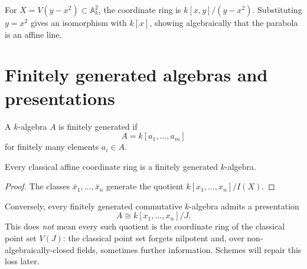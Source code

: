 \begin{center}
\end{center}

\begin{example}\label{ex:vi03-expand-01}
For $X=V(y-x^2)\subset\mathbb A^2_k$, the coordinate ring is $k[x,y]/(y-x^2)$.  Substituting $y=x^2$ gives an isomorphism with $k[x]$, showing algebraically that the parabola is an affine line.
\end{example}
\section{Finitely generated algebras and presentations}
\label{sec:vi03-presentations}

\begin{definition}
A \(k\)-algebra \(A\) is finitely generated if
\[
A=k[a_1,\dots,a_m]
\]
for finitely many elements \(a_i\in A\).
\end{definition}

\begin{proposition}
Every classical affine coordinate ring is a finitely generated \(k\)-algebra.
\end{proposition}

\begin{proof}
The classes \(\bar x_1,\dots,\bar x_n\) generate the quotient
\(k[x_1,\dots,x_n]/I(X)\).
\end{proof}

Conversely, every finitely generated commutative \(k\)-algebra admits a presentation
\[
A\cong k[x_1,\dots,x_n]/J.
\]
This does \emph{not} mean every such quotient is the coordinate ring of the classical point
set \(V(J)\): the classical point set forgets nilpotent and, over non-algebraically-closed
fields, sometimes further information.  Schemes will repair this loss later.

